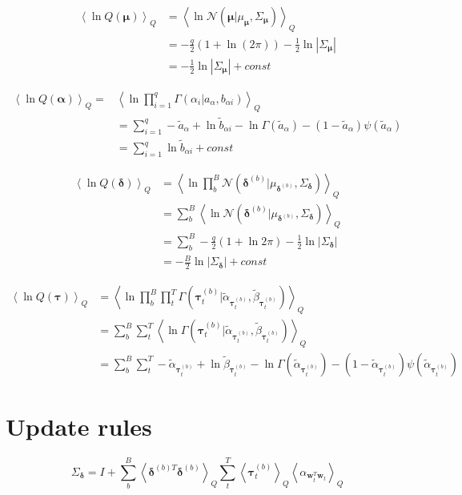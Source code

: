 \documentclass[10pt]{article}
\newcommand{\Angle}[1]{\left \langle #1 \right \rangle}
\newcommand{\Eq}[1]{\Angle{#1}_Q}
\newcommand{\N}[2][]{\mathcal{N} \left( #1,#2 \right)}
\newcommand{\Det}[1]{\left| #1 \right|}
\begin{document}
    \begin{align}
        \Eq{\ln{Q(\bm{\mu})}}&=\Eq{\ln{\N[\bm{\mu} | \mu_{\bm{\mu}}]{\Sigma_{\bm{\mu}}}}} \nonumber \\
        &=-\frac{q}{2}( 1+\ln(2\pi)) - \frac{1}{2}\ln{\Det{\Sigma_{\bm{\mu}}}} \nonumber \\
        &=-\frac{1}{2}\ln{\Det{\Sigma_{\bm{\mu}}}} + const
        \label{qmu}
    \end{align}

    \begin{align}
        \Eq{\ln{Q(\bm{\alpha})}}=&\Eq{\ln{\prod_{i=1}^q \Gamma(\alpha_i \vert a_\alpha,b_{\alpha i})}} \\
        &=\sum_{i=1}^q -\tilde{a}_\alpha+\ln{\tilde{b}_{\alpha i}}-\ln{\Gamma(\tilde{a}_\alpha)}-(1-\tilde{a}_\alpha)\psi(\tilde{a}_\alpha) \\
        &=\sum_{i=1}^q \ln{\tilde{b}_{\alpha i}} + const
        \label{qalpha}
    \end{align}

    \begin{align}
        \Eq{\ln{Q(\bm{\delta})}}&= \Eq{\ln{\prod_b^B\mathcal{N}(\bm{\delta}^{(b)}|\mu_{\bm{\delta}^{(b)}}, \Sigma_{\bm{\delta}})}} \nonumber \\
        &=\sum_b^B\Eq{\ln{\mathcal{N}(\bm{\delta}^{(b)}|\mu_{\bm{\delta}^{(b)}},\Sigma_{\bm{\delta}})}} \nonumber \\
        &= \sum_b^B-\frac{q}{2}(1 + \ln{2\pi}) - \frac{1}{2}\ln{|\Sigma_{\bm{\delta}}|}\nonumber \\
        &= -\frac{B}{2}\ln{|\Sigma_{\bm{\delta}}|} + const
        \label{qdelta}
    \end{align}

    \begin{align}
        \Eq{\ln{Q(\bm{\tau})}}&=\Eq{\ln{\prod_b^B\prod_t^T\Gamma(\bm{\tau}_t^{(b)}|\tilde{\alpha}_{\bm{\tau}_t^{(b)}}, \tilde{\beta}_{\bm{\tau}_t^{(b)}})}} \nonumber \\
        &=\sum_b^B\sum_t^T\Eq{\ln{\Gamma(\bm{\tau}_t^{(b)}|\tilde{\alpha}_{\bm{\tau}_t^{(b)}}, \tilde{\beta}_{\bm{\tau}_t^{(b)}})}} \nonumber \\
        &=\sum_b^B\sum_t^T -\tilde{\alpha}_{\bm{\tau}_t^{(b)}}+ \ln{\tilde{\beta}_{\bm{\tau}_t^{(b)}}} - \ln{\Gamma(\tilde{\alpha}_{\bm{\tau}_t^{(b)}})} - (1 - \tilde{\alpha}_{\bm{\tau}_t^{(b)}}) \psi(\tilde{\alpha}_{\bm{\tau}_t^{(b)}})
        \label{qtau}
    \end{align}

\section{Update rules}
    \begin{equation}
        \Sigma_{\bm{\delta}} = I + \sum_b^B
        \Eq{\bm{\delta}^{(b)T}\bm{\delta}^{(b)}}\sum_t^T\Eq{\bm{\tau}_t^{(b)}}\Eq{\alpha_{\bm{w}_t^T\bm{w}_t}}
    \end{equation}
\end{document}
